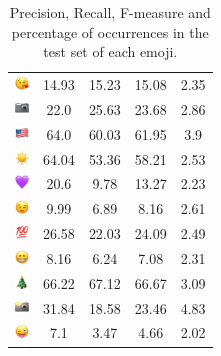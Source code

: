 \documentclass{article}
\begin{document}
\begin{table}
\begin{tabular}{|c|ccc|c|}
\includegraphics[height=0.37cm,width=0.37cm]{img/face_blowing_a_kiss.png} & 14.93 & 15.23 & 15.08 & 2.35\\ 
\includegraphics[height=0.37cm,width=0.37cm]{img/camera.png} & 22.0 & 25.63 & 23.68 & 2.86\\ 
\includegraphics[height=0.37cm,width=0.37cm]{img/United_States.png} & 64.0 & 60.03 & 61.95 & 3.9\\ 
\includegraphics[height=0.37cm,width=0.37cm]{img/sun.png} & 64.04 & 53.36 & 58.21 & 2.53\\ 
\includegraphics[height=0.37cm,width=0.37cm]{img/purple_heart.png} & 20.6 & 9.78 & 13.27 & 2.23\\ 
\includegraphics[height=0.37cm,width=0.37cm]{img/winking_face.png} & 9.99 & 6.89 & 8.16 & 2.61\\ 
\includegraphics[height=0.37cm,width=0.37cm]{img/hundred_points.png} & 26.58 & 22.03 & 24.09 & 2.49\\ 
\includegraphics[height=0.37cm,width=0.37cm]{img/beaming_face_with_smiling_eyes.png} & 8.16 & 6.24 & 7.08 & 2.31\\ 
\includegraphics[height=0.37cm,width=0.37cm]{img/Christmas_tree.png} & 66.22 & 67.12 & 66.67 & 3.09\\ 
\includegraphics[height=0.37cm,width=0.37cm]{img/camera_with_flash.png} & 31.84 & 18.58 & 23.46 & 4.83\\ 
\includegraphics[height=0.37cm,width=0.37cm]{img/winking_face_with_tongue.png} & 7.1 & 3.47 & 4.66 & 2.02\\ 

\hline
\end{tabular}
\caption{\label{table:emoji_detailed} Precision, Recall, F-measure and percentage of occurrences in the test set of each emoji.}
\end{table}
\end{document}
